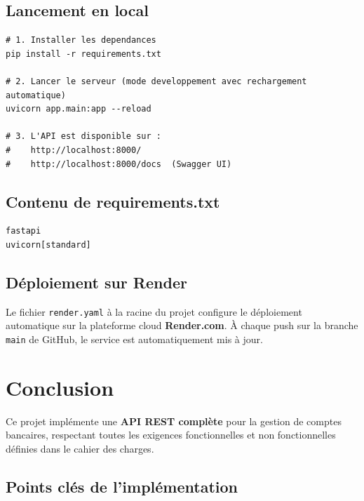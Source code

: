 \documentclass[12pt,a4paper]{article}
\begin{document}
\subsection{Lancement en local}

\begin{lstlisting}[style=bash, caption={Lancement de l'API en local}]
# 1. Installer les dependances
pip install -r requirements.txt

# 2. Lancer le serveur (mode developpement avec rechargement automatique)
uvicorn app.main:app --reload

# 3. L'API est disponible sur :
#    http://localhost:8000/
#    http://localhost:8000/docs  (Swagger UI)
\end{lstlisting}

\subsection{Contenu de requirements.txt}

\begin{lstlisting}[style=bash, caption={requirements.txt}]
fastapi
uvicorn[standard]
\end{lstlisting}

\subsection{Déploiement sur Render}

Le fichier \texttt{render.yaml} à la racine du projet configure le déploiement automatique sur la plateforme cloud \textbf{Render.com}. À chaque push sur la branche \texttt{main} de GitHub, le service est automatiquement mis à jour.

\section{Conclusion}

Ce projet implémente une \textbf{API REST complète} pour la gestion de comptes bancaires, respectant toutes les exigences fonctionnelles et non fonctionnelles définies dans le cahier des charges.

\subsection*{Points clés de l'implémentation}
\end{document}
